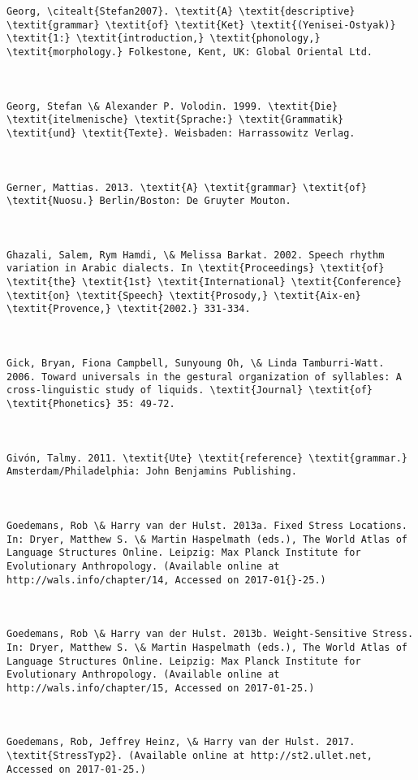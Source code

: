 \begin{verbatim}
Georg, \citealt{Stefan2007}. \textit{A} \textit{descriptive} \textit{grammar} \textit{of} \textit{Ket} \textit{(Yenisei-Ostyak)} \textit{1:} \textit{introduction,} \textit{phonology,} \textit{morphology.} Folkestone, Kent, UK: Global Oriental Ltd.



Georg, Stefan \& Alexander P. Volodin. 1999. \textit{Die} \textit{itelmenische} \textit{Sprache:} \textit{Grammatik} \textit{und} \textit{Texte}. Weisbaden: Harrassowitz Verlag.



Gerner, Mattias. 2013. \textit{A} \textit{grammar} \textit{of} \textit{Nuosu.} Berlin/Boston: De Gruyter Mouton.



Ghazali, Salem, Rym Hamdi, \& Melissa Barkat. 2002. Speech rhythm variation in Arabic dialects. In \textit{Proceedings} \textit{of} \textit{the} \textit{1st} \textit{International} \textit{Conference} \textit{on} \textit{Speech} \textit{Prosody,} \textit{Aix-en} \textit{Provence,} \textit{2002.} 331-334.



Gick, Bryan, Fiona Campbell, Sunyoung Oh, \& Linda Tamburri-Watt. 2006. Toward universals in the gestural organization of syllables: A cross-linguistic study of liquids. \textit{Journal} \textit{of} \textit{Phonetics} 35: 49-72.



Givón, Talmy. 2011. \textit{Ute} \textit{reference} \textit{grammar.} Amsterdam/Philadelphia: John Benjamins Publishing.



Goedemans, Rob \& Harry van der Hulst. 2013a. Fixed Stress Locations. In: Dryer, Matthew S. \& Martin Haspelmath (eds.), The World Atlas of Language Structures Online. Leipzig: Max Planck Institute for Evolutionary Anthropology. (Available online at http://wals.info/chapter/14, Accessed on 2017-01{}-25.)



Goedemans, Rob \& Harry van der Hulst. 2013b. Weight-Sensitive Stress. In: Dryer, Matthew S. \& Martin Haspelmath (eds.), The World Atlas of Language Structures Online. Leipzig: Max Planck Institute for Evolutionary Anthropology. (Available online at http://wals.info/chapter/15, Accessed on 2017-01-25.)



Goedemans, Rob, Jeffrey Heinz, \& Harry van der Hulst. 2017. \textit{StressTyp2}. (Available online at http://st2.ullet.net, Accessed on 2017-01-25.)




\end{verbatim}
